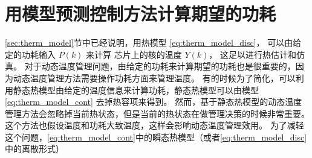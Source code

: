 \section{用模型预测控制方法计算期望的功耗}\label{sec:mpc}
\ref{sec:therm_model}节中已经说明，用热模型 \eqref{eq:therm_model_disc}， 可以由给定的功耗输入 $P(k)$ 来计算
芯片上的核的温度 $Y(k)$， 这足以进行热估计和仿真。
对于动态温度管理问题，由给定的功耗来计算期望的功耗也是很重要的，因为动态温度管理方法需要操作功耗方面来管理温度。
有的时候为了简化，可以利用静态热模型由给定的温度信息来计算功耗，静态热模型可以由模型 \eqref{eq:therm_model_cont} 去掉热容项来得到。
然而，基于静态热模型的动态温度管理方法会忽略掉当前热状态，但是当前的热状态在做管理决策的时候非常重要。
这个方法也假设温度和功耗大致温度，这样会影响动态温度管理效用。
为了减轻这个问题，\eqref{eq:therm_model_cont}中的瞬态热模型（或者\eqref{eq:therm_model_disc}中的离散形式）





























